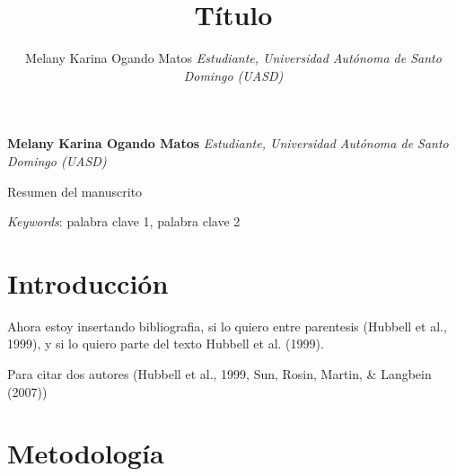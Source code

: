 \documentclass[11pt,]{article}
\title{Título\\[2\baselineskip]  }
\author{\Large Melany Karina Ogando Matos\vspace{0.05in} \newline\normalsize\emph{Estudiante, Universidad Autónoma de Santo Domingo (UASD)}  }
\date{}
\newcommand*{\authorfont}{\fontfamily{phv}\selectfont}
\renewenvironment{abstract}
 {{%
    \setlength{\leftmargin}{0mm}
    \setlength{\rightmargin}{\leftmargin}%
  }%
  \relax}
 {\endlist}
\begin{document}
	
%

{%
\setlength{\parindent}{0pt}
\thispagestyle{plain}
{\fontsize{18}{20}\selectfont\raggedright 
\maketitle  %

}

{
   \vskip 13.5pt\relax \normalsize\fontsize{11}{12} 
\textbf{\authorfont Melany Karina Ogando Matos} \hskip 15pt \emph{\small Estudiante, Universidad Autónoma de Santo Domingo (UASD)}   

}

}








\begin{abstract}

    \hbox{\vrule height .2pt width 39.14pc}

    \vskip 8.5pt %

\noindent Resumen del manuscrito


\vskip 8.5pt \noindent \emph{Keywords}: palabra clave 1, palabra clave 2 \par

    \hbox{\vrule height .2pt width 39.14pc}



\end{abstract}


\vskip 6.5pt


\noindent  \section{Introducción}\label{introducciuxf3n}

Ahora estoy insertando bibliografia, si lo quiero entre parentesis
(Hubbell et al., 1999), y si lo quiero parte del texto Hubbell et al.
(1999).

Para citar dos autores (Hubbell et al., 1999, Sun, Rosin, Martin, \&
Langbein (2007))

\section{Metodología}\label{metodologuxeda}
\end{document}
